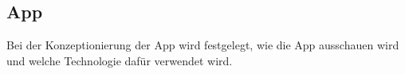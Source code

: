 \subsection{App}
Bei der Konzeptionierung der App wird festgelegt, wie die App ausschauen wird und welche Technologie dafür verwendet wird.




